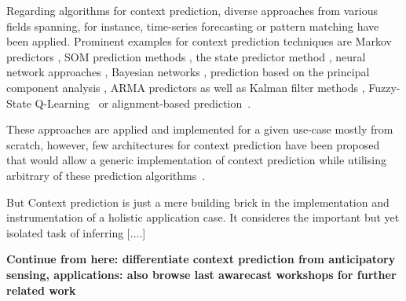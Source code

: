 Regarding algorithms for context prediction, diverse approaches from various fields spanning, for instance, time-series forecasting or pattern matching have been applied. 
Prominent examples for context prediction techniques are Markov predictors \cite{6013}, SOM prediction methods \cite{6016,5001}, the state predictor method \cite{5027,5001}, neural network approaches \cite{5027,2026}, Bayesian networks \cite{5027}, prediction based on the principal component analysis \cite{2097}, ARMA predictors \cite{5001} as well as Kalman filter methods \cite{2040}, Fuzzy-State Q-Learning~\cite{ContextPrediction_Feki_2007} or alignment-based prediction~\cite{4026}.

These approaches are applied and implemented for a given use-case mostly from scratch, however, few architectures for context prediction have been proposed that would allow a generic implementation of context prediction while utilising arbitrary of these prediction algorithms~\cite{4011,5001,5010}.

But Context prediction is just a mere building brick in the implementation and instrumentation of a holistic application case. 
It consideres the important but yet isolated task of inferring [....]


\textbf{Continue from here: differentiate context prediction from anticipatory sensing, applications:  also browse last awarecast workshops for further related work}

